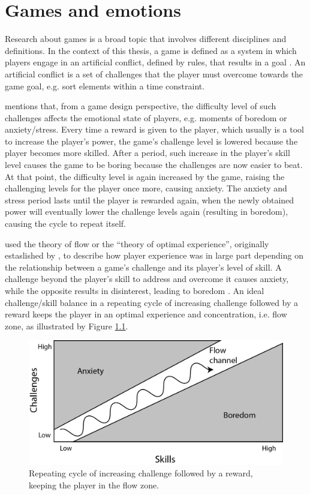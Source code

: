 \chapter{Games and emotions}
\label{ch:literature-games}

Research about games is a broad topic that involves different disciplines and definitions. In the context of this thesis, a game is defined as a system in which players engage in an artificial conflict, defined by rules, that results in a goal \parencite{salen2004rules}. An artificial conflict is a set of challenges that the player must overcome towards the game goal, e.g. sort elements within a time constraint.

\textcite{schell2014art} mentions that, from a game design perspective, the difficulty level of such challenges affects the emotional state of players, e.g. moments of boredom or anxiety/stress. Every time a reward is given to the player, which usually is a tool to increase the player's power, the game's challenge level is lowered because the player becomes more skilled. After a period, such increase in the player's skill level causes the game to be boring because the challenges are now easier to beat. At that point, the difficulty level is again increased by the game, raising the challenging levels for the player once more, causing anxiety. The anxiety and stress period lasts until the player is rewarded again, when the newly obtained power will eventually lower the challenge levels again (resulting in boredom), causing the cycle to repeat itself.

\textcite{chen2007flow} used the theory of flow or the ``theory of optimal experience'', originally estaslished by \textcite{csikszentmihalyi1991flow}, to describe how player experience was in large part depending on the relationship between a game's challenge and its player's level of skill. A challenge beyond the player's skill to address and overcome it causes anxiety, while the opposite results in disinterest, leading to boredom \parencite{chen2007flow}. An ideal challenge/skill balance in a repeating cycle of increasing challenge followed by a reward keeps the player in an optimal experience and concentration, i.e. flow zone, as illustrated by Figure \ref{fig:flow-schell}.

\begin{figure}[h!]
    \centering
    \includegraphics[scale=0.8]{figures/flow-schell.png}
    \caption{Repeating cycle of increasing challenge followed by a reward, keeping the player in the flow zone. \parencite{schell2014art}}
    \label{fig:flow-schell}
\end{figure}

